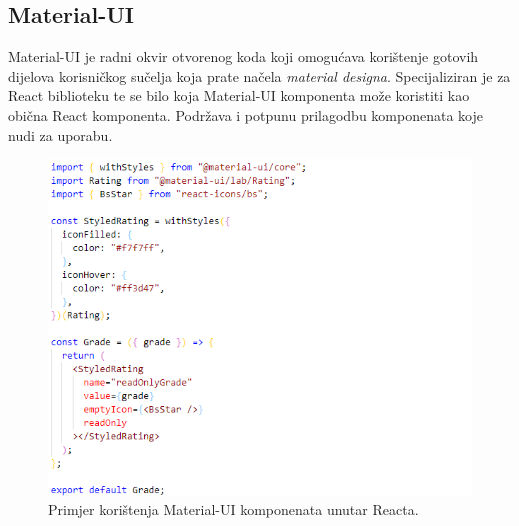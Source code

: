 \documentclass[times, utf8, zavrsni]{fer}
\begin{document}
			\subsection{Material-UI}
			Material-UI je radni okvir otvorenog koda koji omogućava korištenje gotovih dijelova korisničkog sučelja koja prate načela \textit{material designa}. Specijaliziran je za React biblioteku te se bilo koja Material-UI komponenta može koristiti kao obična React komponenta. Podržava i potpunu prilagodbu komponenata koje nudi za uporabu.
			\begin{figure}[H]
				\centering
				\includegraphics[scale=0.75]{pictures/prikazi/MaterialUI.png}
				\caption{Primjer korištenja Material-UI komponenata unutar Reacta.}
				\label{fig:materialUI}
			\end{figure}
			
\end{document}
